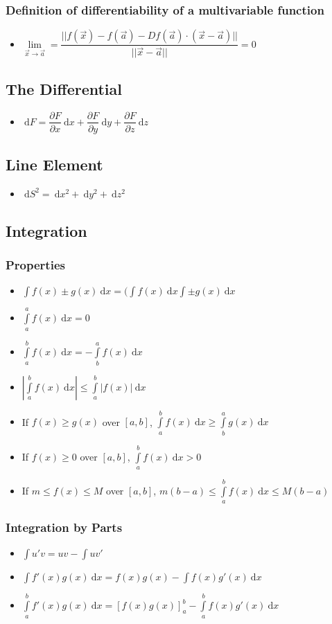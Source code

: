 \documentclass[]{report}
\newcommand \tab[1][1cm]{\hspace*{#1}}
\newcommand{\dn}[1]{\ \mathrm{d}#1}
\newcommand{\itemt}{\item \tab}
\begin{document}
\subsubsection{Definition of differentiability of a multivariable function}
\begin{itemize}
\itemt \( \lim\limits_{\vec{x}\to\vec{a}} = \dfrac{||f(\vec{x})-f(\vec{a}) - Df(\vec{a})\cdot(\vec{x}-\vec{a})||}{||\vec{x}-\vec{a}||} = 0\)
\end{itemize}


		\subsection{The Differential}
\begin{itemize}
\itemt \( \dn F = \dfrac{\partial F}{\partial x}\dn x + \dfrac{\partial F}{\partial y}\dn y + \dfrac{\partial F}{\partial z}\dn z \)
\end{itemize}


		\subsection{Line Element}
\begin{itemize}
\itemt \( \dn S^2 = \dn x^2 + \dn y^2 + \dn z^2 \)
\end{itemize}	


		\subsection{Integration}

\subsubsection{Properties}
\begin{itemize}
\itemt \( \int f(x) \pm g(x) \dn x = ( \int f(x)\dn x \int \pm g(x) \dn x \)
\itemt \( \int\limits_a^a f(x) \dn x = 0 \)
\itemt \( \int\limits_a^b f(x) \dn x = -\int\limits_b^a f(x) \dn x \)
\itemt \( |\int\limits_a^b f(x) \dn x| \leq \int\limits_a^b |f(x)| \dn x \)
\itemt If \( f(x) \geq g(x) \) over $[a,b]$, \( \int\limits_a^b f(x) \dn x \geq \int\limits_b^a g(x) \dn x \)
\itemt If \( f(x) \geq 0 \) over $[a,b]$, \( \int\limits_a^b f(x) \dn x > 0 \)
\itemt If \( m\leq f(x) \leq M \) over $[a,b]$, \( m(b-a) \leq \int\limits_a^b f(x) \dn x \leq M(b-a) \)
\end{itemize}

\subsubsection{Integration by Parts}			
\begin{itemize}
\itemt \( \int u'v = uv - \int uv' \)
\itemt \( \int f'(x)g(x) \dn x = f(x)g(x) - \int f(x)g'(x) \dn x \)				
\itemt \( \int\limits_a^b f'(x)g(x) \dn x = [f(x)g(x)]^b_a - \int\limits_a^b f(x)g'(x) \dn x \)
\end{itemize}	
\end{document}
